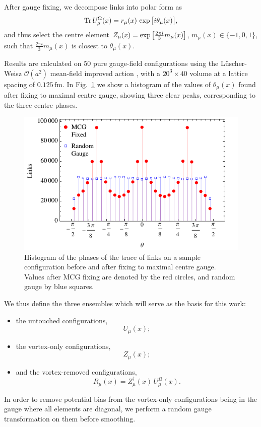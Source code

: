 \documentclass[
 reprint,
 amsmath,amssymb,
 aps,
prd,
]{revtex4-1}
\begin{document}
After gauge fixing, we decompose links into polar form as
\begin{equation}
\mathrm{Tr} \, U_{\mu}^{\Omega}(x) = r_{\mu}(x)\,\exp \big{[}i\theta_{\mu}(x)\big{]},
\end{equation}
and thus select the centre element $Z_{\mu}(x) = \exp\big{[}\frac{2\pi i}{3} m_{\mu}(x)\big{]}$, $m_{\mu}(x) \in \{-1,0,1\}$, such that $\frac{2\pi i}{3}m_{\mu}(x)$ is closest to $\theta_{\mu}(x)$. \par 
Results are calculated on $50$ pure gauge-field configurations using the L{\"u}scher-Weisz $\mathcal{O}(a^{2})$ mean-field improved action \cite{Luscher:1984xn}, with a $20^{3} \times 40$ volume at a lattice spacing of $0.125 \, \mathrm{fm}$. In Fig.~\ref{Thetahist} we show a histogram of the values of $\theta_{\mu}(x)$ found after fixing to maximal centre gauge, showing three clear peaks, corresponding to the three centre phases. \par
\begin{figure}[htbp]
\includegraphics[width=\columnwidth]{ThetaHist.pdf}
\caption{Histogram of the phases of the trace of links on a sample configuration before and after fixing to maximal centre gauge. Values after MCG fixing are denoted by the red circles, and random gauge by blue squares.}
\label{Thetahist}
\end{figure}
We thus define the three ensembles which will serve as the basis for this work:
\begin{itemize}
\item
the untouched configurations,
\begin{equation}
U_{\mu}(x);
\end{equation}
\item
the vortex-only configurations,
\begin{equation}
Z_{\mu}(x);
\end{equation}
\item
and the vortex-removed configurations,
\begin{equation}
R_{\mu}(x) = Z_{\mu}^{\dagger}(x)\,U_{\mu}^{\Omega}(x).
\end{equation}
\end{itemize}
In order to remove potential bias from the vortex-only configurations being in the gauge where all elements are diagonal, we perform a random gauge transformation on them before smoothing. 
\end{document}
